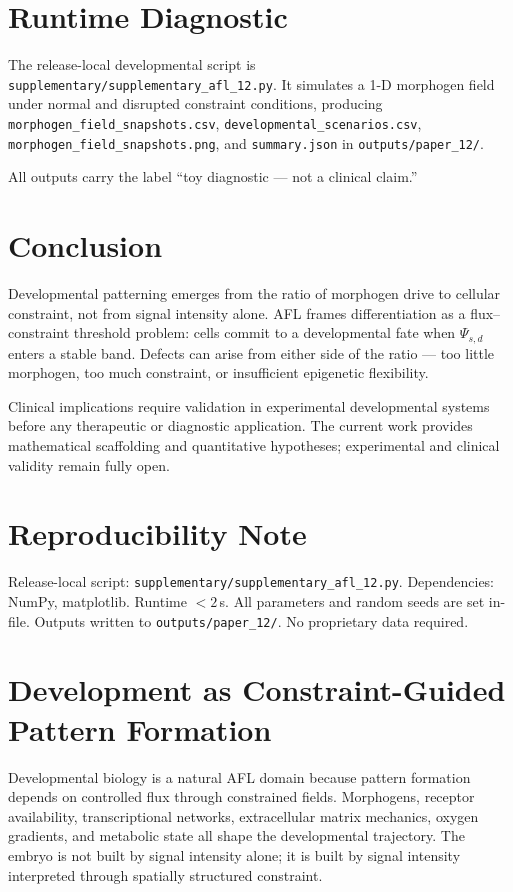 \documentclass[11pt]{article}
\begin{document}
\section{Runtime Diagnostic}

The release-local developmental script is \texttt{supplementary/supplementary\_afl\_12.py}. It simulates a 1-D morphogen field under normal and disrupted constraint conditions, producing \texttt{morphogen\_field\_snapshots.csv}, \texttt{developmental\_scenarios.csv}, \texttt{morphogen\_field\_snapshots.png}, and \texttt{summary.json} in \texttt{outputs/paper\_12/}.

All outputs carry the label ``toy diagnostic --- not a clinical claim.''

\section{Conclusion}

Developmental patterning emerges from the ratio of morphogen drive to cellular constraint, not from signal intensity alone. AFL frames differentiation as a flux--constraint threshold problem: cells commit to a developmental fate when $\Psi_{s,d}$ enters a stable band. Defects can arise from either side of the ratio --- too little morphogen, too much constraint, or insufficient epigenetic flexibility.

Clinical implications require validation in experimental developmental systems before any therapeutic or diagnostic application. The current work provides mathematical scaffolding and quantitative hypotheses; experimental and clinical validity remain fully open.

\section{Reproducibility Note}

Release-local script: \texttt{supplementary/supplementary\_afl\_12.py}. Dependencies: NumPy, matplotlib. Runtime $< 2$\,s. All parameters and random seeds are set in-file. Outputs written to \texttt{outputs/paper\_12/}. No proprietary data required.



\section{Development as Constraint-Guided Pattern Formation}
Developmental biology is a natural AFL domain because pattern formation depends on controlled flux through constrained fields. Morphogens, receptor availability, transcriptional networks, extracellular matrix mechanics, oxygen gradients, and metabolic state all shape the developmental trajectory. The embryo is not built by signal intensity alone; it is built by signal intensity interpreted through spatially structured constraint.
\end{document}
